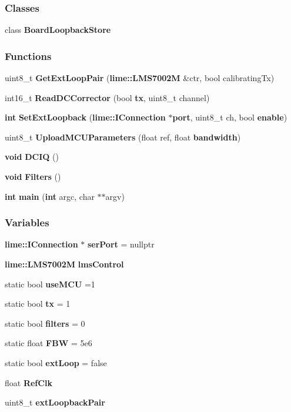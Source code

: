 \subsubsection*{Classes}
\begin{DoxyCompactItemize}
\item 
class {\bf Board\+Loopback\+Store}
\end{DoxyCompactItemize}
\subsubsection*{Functions}
\begin{DoxyCompactItemize}
\item 
uint8\+\_\+t {\bf Get\+Ext\+Loop\+Pair} ({\bf lime\+::\+L\+M\+S7002M} \&ctr, bool calibrating\+Tx)
\item 
int16\+\_\+t {\bf Read\+D\+C\+Corrector} (bool {\bf tx}, uint8\+\_\+t channel)
\item 
{\bf int} {\bf Set\+Ext\+Loopback} ({\bf lime\+::\+I\+Connection} $\ast${\bf port}, uint8\+\_\+t ch, bool {\bf enable})
\item 
uint8\+\_\+t {\bf Upload\+M\+C\+U\+Parameters} (float ref, float {\bf bandwidth})
\item 
{\bf void} {\bf D\+C\+IQ} ()
\item 
{\bf void} {\bf Filters} ()
\item 
{\bf int} {\bf main} ({\bf int} argc, char $\ast$$\ast$argv)
\end{DoxyCompactItemize}
\subsubsection*{Variables}
\begin{DoxyCompactItemize}
\item 
{\bf lime\+::\+I\+Connection} $\ast$ {\bf ser\+Port} = nullptr
\item 
{\bf lime\+::\+L\+M\+S7002M} {\bf lms\+Control}
\item 
static bool {\bf use\+M\+CU} =1
\item 
static bool {\bf tx} = 1
\item 
static bool {\bf filters} = 0
\item 
static float {\bf F\+BW} = 5e6
\item 
static bool {\bf ext\+Loop} = false
\item 
float {\bf Ref\+Clk}
\item 
uint8\+\_\+t {\bf ext\+Loopback\+Pair}
\end{DoxyCompactItemize}


